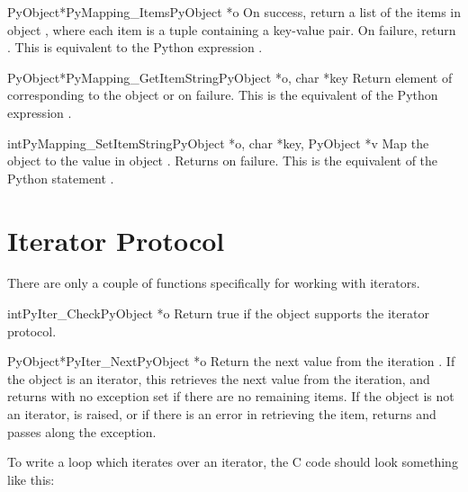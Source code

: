 \begin{cfuncdesc}{PyObject*}{PyMapping_Items}{PyObject *o}
  On success, return a list of the items in object , where each
  item is a tuple containing a key-value pair.  On failure, return
  \NULL. This is equivalent to the Python expression
  .
\end{cfuncdesc}


\begin{cfuncdesc}{PyObject*}{PyMapping_GetItemString}{PyObject *o, char *key}
  Return element of  corresponding to the object  or
  \NULL{} on failure. This is the equivalent of the Python expression
  .
\end{cfuncdesc}

\begin{cfuncdesc}{int}{PyMapping_SetItemString}{PyObject *o, char *key,
                                                PyObject *v}
  Map the object  to the value  in object .
  Returns  on failure.  This is the equivalent of the Python
  statement .
\end{cfuncdesc}


\section{Iterator Protocol \label{iterator}}


There are only a couple of functions specifically for working with
iterators.

\begin{cfuncdesc}{int}{PyIter_Check}{PyObject *o}
  Return true if the object  supports the iterator protocol.
\end{cfuncdesc}

\begin{cfuncdesc}{PyObject*}{PyIter_Next}{PyObject *o}
  Return the next value from the iteration .  If the object is
  an iterator, this retrieves the next value from the iteration, and
  returns \NULL{} with no exception set if there are no remaining
  items.  If the object is not an iterator,  is
  raised, or if there is an error in retrieving the item, returns
  \NULL{} and passes along the exception.
\end{cfuncdesc}

To write a loop which iterates over an iterator, the C code should
look something like this:

